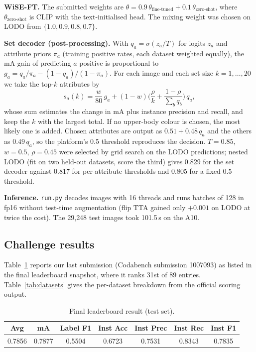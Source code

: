 \documentclass[a4paper, 10pt, conference]{ieeeconf}
\begin{document}
\textbf{WiSE-FT.} The submitted weights are $\theta = 0.9\,\theta_{\text{fine-tuned}} + 0.1\,\theta_{\text{zero-shot}}$, where $\theta_{\text{zero-shot}}$ is CLIP with the text-initialised head. The mixing weight was chosen on LODO from $\{1.0, 0.9, 0.8, 0.7\}$.

\textbf{Set decoder (post-processing).} With $q_a = \sigma(z_a/T)$ for logits $z_a$ and attribute priors $\pi_a$ (training positive rates, each dataset weighted equally), the mA gain of predicting $a$ positive is proportional to $g_a = q_a/\pi_a - (1-q_a)/(1-\pi_a)$. For each image and each set size $k = 1,\dots,20$ we take the top-$k$ attributes by
\begin{equation}
s_a(k) = \frac{w}{80}\,g_a + (1-w)\Big(\frac{\rho}{k} + \frac{1-\rho}{\sum_b q_b}\Big)\,q_a ,
\end{equation}
whose sum estimates the change in mA plus instance precision and recall, and keep the $k$ with the largest total. If no upper-body colour is chosen, the most likely one is added. Chosen attributes are output as $0.51 + 0.48\,q_a$ and the others as $0.49\,q_a$, so the platform's 0.5 threshold reproduces the decision. $T=0.85$, $w=0.5$, $\rho=0.45$ were selected by grid search on the LODO predictions; nested LODO (fit on two held-out datasets, score the third) gives 0.829 for the set decoder against 0.817 for per-attribute thresholds and 0.805 for a fixed 0.5 threshold.

\textbf{Inference.} \texttt{run.py} decodes images with 16 threads and runs batches of 128 in fp16 without test-time augmentation (flip TTA gained only $+0.001$ on LODO at twice the cost). The 29{,}248 test images took 101.5\,s on the A10.

\subsection{Challenge results}
Table~\ref{tab:results} reports our last submission (Codabench submission 1007093) as listed in the final leaderboard snapshot, where it ranks 31st of 89 entries. Table~\ref{tab:datasets} gives the per-dataset breakdown from the official scoring output.

\begin{table}[h]
\centering
\caption{Final leaderboard result (test set).}
\label{tab:results}
\setlength{\tabcolsep}{3.5pt}
\begin{tabular}{ccccccc}
\toprule
Avg & mA & Label F1 & Inst Acc & Inst Prec & Inst Rec & Inst F1 \\
\midrule
0.7856 & 0.7877 & 0.5504 & 0.6723 & 0.7531 & 0.8343 & 0.7835 \\
\bottomrule
\end{tabular}
\end{table}
\end{document}
